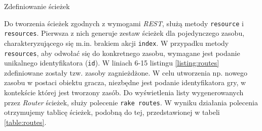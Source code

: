 \documentclass[a4paper,12pt]{article}
\begin{document}
\begin{listing}
  
  \caption{Zdefiniowanie ścieżek}
  \label{listing:routes}
\end{listing}

Do tworzenia ścieżek zgodnych z wymogami \emph{REST}, służą metody
\texttt{resource} i \texttt{resources}. Pierwsza z nich generuje
zestaw ścieżek dla pojedynczego zasobu, charakteryzującego się
m.in. brakiem akcji \texttt{index}. W przypadku metody
\texttt{resources}, aby odwołać się do konkretnego zasobu, wymagane
jest podanie unikalnego identyfikatora (\texttt{id}). W liniach 6-15
listingu \ref{listing:routes} zdefiniowane zostały tzw. zasoby
zagnieżdżone. W celu utworzenia np. nowego zasobu w postaci obiektu
gracza, niezbędne jest podanie identyfikatora gry, w kontekście której
jest tworzony zasób. Do wyświetlenia listy wygenerowanych przez
\emph{Router} ścieżek, służy polecenie \texttt{rake routes}. W wyniku
działania polecenia otrzymujemy tablicę ścieżek, podobną do tej,
przedstawionej w tabeli \ref{table:routes}.
\end{document}
